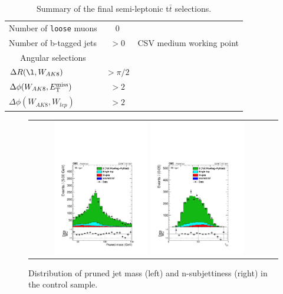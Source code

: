 \begin{table}[h!]
\begin{tabular}{lcc}
Number of \texttt{loose} muons & 0    & \\
Number of b-tagged jets           & $>0$    & CSV medium working point \\
\hline
\multicolumn{1}{c}{Angular selections}\\
\cline{1-1}
$\Delta R(\l,W_{AK8})         $ & $> \pi/2$ & \\
$\Delta \phi(W_{AK8},E_{\mathrm{T}}^{\text{miss}}) $ & $> 2$     & \\
$\Delta \phi(W_{AK8},W_{lep}) $ & $> 2$     & \\
\hline
\end{tabular}
\caption{Summary of the final semi-leptonic t$\bar{t}$ selections.}
\label{tab:searchII:cutsummary}
\end{table}

\begin{figure}[ht!]
\centering
\begin{tabular}{cc}
\includegraphics[width=0.4\textwidth]{figures/vtagging/AN-16-215/Whadr_pruned_mu.pdf}
\includegraphics[width=0.4\textwidth]{figures/vtagging/AN-16-215/Whadr_tau21_mu.pdf}\\
\end{tabular}
\caption{Distribution of pruned jet mass (left) and n-subjettiness (right) in the \ttbar control sample.} 
\label{fig:searchI:ttbarcp}
\end{figure}


